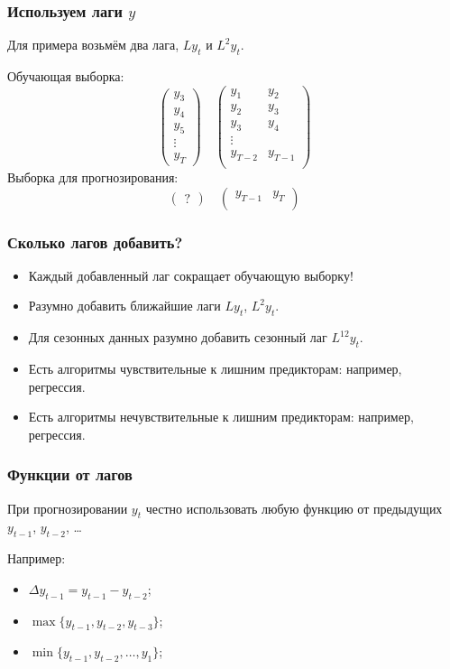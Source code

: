 \begin{frame}
  \frametitle{Используем лаги $y$}

  Для примера возьмём два лага, $Ly_t$ и $L^2 y_t$.
  \pause

  Обучающая выборка:
  \[
  \begin{pmatrix}
    y_3 \\
    y_4 \\
    y_5 \\
    \vdots \\
    y_T 
  \end{pmatrix}  \quad 
  \begin{pmatrix}
    y_1 & y_2 \\
    y_2 & y_3 \\
    y_3 & y_4 \\
    \vdots \\
    y_{T-2} & y_{T-1} \\ 
  \end{pmatrix}
  \]
  \pause
  Выборка для прогнозирования:
  \[
  \begin{pmatrix}
    ? 
  \end{pmatrix}  \quad 
  \begin{pmatrix}
    y_{T-1} & y_{T} \\ 
  \end{pmatrix}
  \]
  
\end{frame}

\begin{frame}
  \frametitle{Сколько лагов добавить?}

  \begin{itemize}[<+->]
    \item Каждый добавленный лаг \alert{сокращает} обучающую выборку!
    \item Разумно добавить \alert{ближайшие лаги} $Ly_t$, $L^2y_t$.
    \item Для сезонных данных разумно добавить \alert{сезонный лаг} $L^{12} y_t$.
    \item Есть алгоритмы \alert{чувствительные к лишним предикторам}: например, регрессия. 
    \item Есть алгоритмы \alert{нечувствительные к лишним предикторам}: например, регрессия.
  \end{itemize}
\end{frame}

\begin{frame}
  \frametitle{Функции от лагов}
  При прогнозировании $y_{t}$ \alert{честно} использовать любую функцию от \alert{предыдущих} $y_{t-1}$, $y_{t-2}$, \ldots

  \pause

  Например:
  \begin{itemize}[<+->]
    \item $\Delta y_{t-1} = y_{t-1} - y_{t-2}$;
    \item $\max\{ y_{t-1}, y_{t-2}, y_{t-3} \}$;
    \item $\min\{ y_{t-1}, y_{t-2}, \ldots, y_1\}$;
  \end{itemize}
\end{frame}


